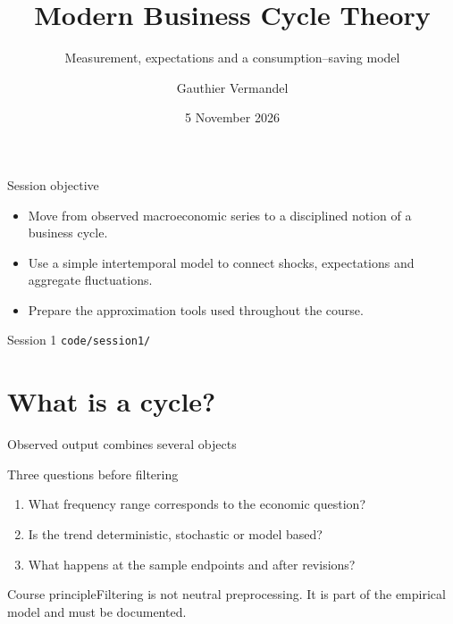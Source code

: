 \documentclass[aspectratio=169,10pt]{beamer}
\title[BTM -- Session 1]{Modern Business Cycle Theory}
\subtitle{Measurement, expectations and a consumption--saving model}
\author[Gauthier Vermandel]{Gauthier Vermandel}
\institute{Paris-Dauphine -- PSL}
\date{5 November 2026}
\begin{document}
\begin{frame}\titlepage\end{frame}
\begin{frame}{Session objective}
\begin{itemize}
\item Move from observed macroeconomic series to a disciplined notion of a business cycle.
\item Use a simple intertemporal model to connect shocks, expectations and aggregate fluctuations.
\item Prepare the approximation tools used throughout the course.
\end{itemize}
\vfill{} Session 1 \quad {} \texttt{code/session1/}
\end{frame}
\section{What is a cycle?}
\begin{frame}{Observed output combines several objects}
\centering{}\end{frame}
\begin{frame}{Three questions before filtering}
\begin{enumerate}\item What frequency range corresponds to the economic question?\item Is the trend deterministic, stochastic or model based?\item What happens at the sample endpoints and after revisions?\end{enumerate}
\vfill\begin{block}{Course principle}Filtering is not neutral preprocessing. It is part of the empirical model and must be documented.\end{block}
\end{frame}
\end{document}
